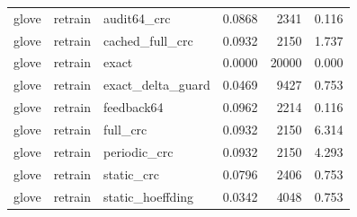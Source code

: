 \begin{tabular}{lllrrr}
glove & retrain & audit64\_crc & 0.0868 & 2341 & 0.116 \\
glove & retrain & cached\_full\_crc & 0.0932 & 2150 & 1.737 \\
glove & retrain & exact & 0.0000 & 20000 & 0.000 \\
glove & retrain & exact\_delta\_guard & 0.0469 & 9427 & 0.753 \\
glove & retrain & feedback64 & 0.0962 & 2214 & 0.116 \\
glove & retrain & full\_crc & 0.0932 & 2150 & 6.314 \\
glove & retrain & periodic\_crc & 0.0932 & 2150 & 4.293 \\
glove & retrain & static\_crc & 0.0796 & 2406 & 0.753 \\
glove & retrain & static\_hoeffding & 0.0342 & 4048 & 0.753 \\
\hline
\end{tabular}

